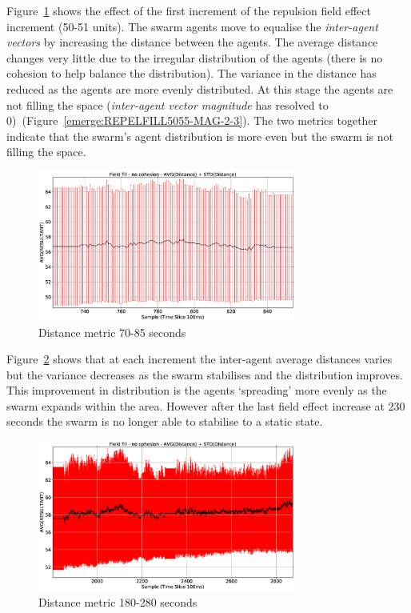 \documentclass[10pt,journal,letterpaper,twoside]{IEEEtran}
\begin{document}
Figure~\ref{emerge:REPELFILL5055-DIST-1-2} shows the effect of the first increment of the repulsion field effect increment (50-51 units). The swarm agents move to equalise the \textit{inter-agent vectors} by increasing the distance between the agents. The average distance changes very little due to the irregular distribution of the agents (there is no cohesion to help balance the distribution). The variance in the distance has reduced as the agents are more evenly distributed. At this stage the agents are not filling the space (\textit{inter-agent vector magnitude} has resolved to 0)~(Figure~\ref{emerge:REPELFILL5055-MAG-2-3}). The two metrics together indicate that the swarm's agent distribution is more even but the swarm is not filling the space.

\begin{figure}
\begin{center}
\includegraphics[width=8.5cm]{figures/REPELFILL5055-DIST-1-2}
\end{center}
\caption{Distance metric 70-85 seconds\label{emerge:REPELFILL5055-DIST-1-2}}
\end{figure}

Figure~\ref{emerge:REPELFILL5055-DIST-2-3} shows that at each increment the inter-agent average distances varies but the variance decreases as the swarm stabilises and the distribution improves. This improvement in distribution is the agents `spreading' more evenly as the swarm expands within the area. However after the last field effect increase at 230 seconds the swarm is no longer able to stabilise to a static state. 

\begin{figure}
\begin{center}
\includegraphics[width=8.5cm]{figures/REPELFILL5055-DIST-2-3}
\end{center}
\caption{Distance metric 180-280 seconds\label{emerge:REPELFILL5055-DIST-2-3}}
\end{figure}
\end{document}
